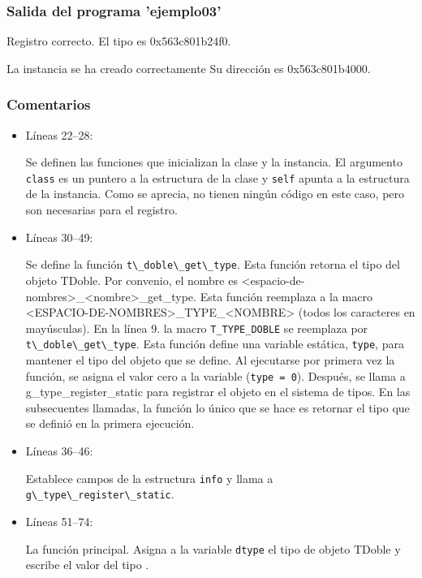  \subsubsection{Salida del programa 'ejemplo03'}
\textsf{Registro correcto. El tipo es 0x563c801b24f0.}\par
\textsf{La instancia se ha creado correctamente Su dirección es 0x563c801b4000.}\par

\subsubsection{Comentarios}
\begin{itemize}
\item Líneas 22--28:\par
  Se definen las funciones que inicializan la clase y la instancia. El argumento \texttt{class} es un puntero a la
  estructura de la clase y \texttt{self} apunta a la estructura de la instancia. Como se aprecia, no tienen ningún
  código en este caso, pero son necesarias para el registro.
\item Líneas 30--49:\par
  Se define la función \passthrough{\lstinline!t\_doble\_get\_type!}. Esta función retorna el tipo del objeto
  \textsf{TDoble}.
  Por convenio, el nombre es \textsf{<espacio-de-nombres>\_<nombre>\_get\_type}. Esta función reemplaza
  a la macro \textsf{<ESPACIO-DE-NOMBRES>\_TYPE\_<NOMBRE>} (todos los caracteres en mayúsculas).
  En la línea 9. la macro \texttt{T\_TYPE\_DOBLE} se reemplaza por \passthrough{\lstinline!t\_doble\_get\_type!}.
  Esta función define una variable estática, \texttt{type}, para mantener el tipo del objeto que se define.
  Al ejecutarse por primera vez la función, se asigna el valor cero a la variable (\texttt{type = 0}).
  Después, se llama a g\_type\_register\_static para registrar el objeto en el sistema de tipos. En las subsecuentes
  llamadas, la función lo único que se hace es retornar el tipo que se definió en la primera ejecución.
\item Líneas 36--46:\par
  Establece campos de la estructura \texttt{info} y llama a \passthrough{\lstinline!g\_type\_register\_static!}.
\item Líneas 51--74:\par
  La función principal. Asigna a la variable \texttt{dtype} el tipo de objeto \textsf{TDoble} y escribe el valor
  del tipo .
  \end{itemize}
 \par


  


